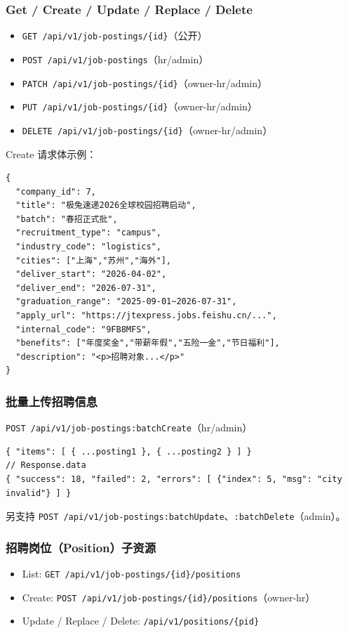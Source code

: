 \documentclass[11pt,a4paper]{ctexart}
\begin{document}
\subsubsection{Get / Create / Update / Replace / Delete}
\begin{itemize}[leftmargin=2em]
    \item \texttt{GET    /api/v1/job-postings/\{id\}}（公开）
    \item \texttt{POST   /api/v1/job-postings}（hr/admin）
    \item \texttt{PATCH  /api/v1/job-postings/\{id\}}（owner-hr/admin）
    \item \texttt{PUT    /api/v1/job-postings/\{id\}}（owner-hr/admin）
    \item \texttt{DELETE /api/v1/job-postings/\{id\}}（owner-hr/admin）
\end{itemize}
Create 请求体示例：
\begin{lstlisting}
{
  "company_id": 7,
  "title": "极兔速递2026全球校园招聘启动",
  "batch": "春招正式批",
  "recruitment_type": "campus",
  "industry_code": "logistics",
  "cities": ["上海","苏州","海外"],
  "deliver_start": "2026-04-02",
  "deliver_end": "2026-07-31",
  "graduation_range": "2025-09-01~2026-07-31",
  "apply_url": "https://jtexpress.jobs.feishu.cn/...",
  "internal_code": "9FB8MFS",
  "benefits": ["年度奖金","带薪年假","五险一金","节日福利"],
  "description": "<p>招聘对象...</p>"
}
\end{lstlisting}

\subsubsection{批量上传招聘信息}
\texttt{POST /api/v1/job-postings:batchCreate}（hr/admin）
\begin{lstlisting}
{ "items": [ { ...posting1 }, { ...posting2 } ] }
// Response.data
{ "success": 18, "failed": 2, "errors": [ {"index": 5, "msg": "city invalid"} ] }
\end{lstlisting}
另支持 \texttt{POST /api/v1/job-postings:batchUpdate}、\texttt{:batchDelete}（admin）。

\subsubsection{招聘岗位（Position）子资源}
\begin{itemize}[leftmargin=2em]
    \item List: \texttt{GET /api/v1/job-postings/\{id\}/positions}
    \item Create: \texttt{POST /api/v1/job-postings/\{id\}/positions}（owner-hr）
    \item Update / Replace / Delete: \texttt{/api/v1/positions/\{pid\}}
\end{itemize}
\end{document}
